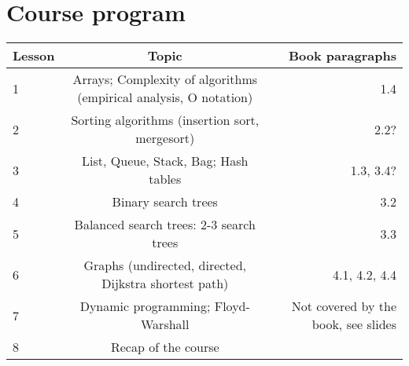 \section{Course program}
	
	\begin{tabular}{ | l | c | r | }
		\hline
	  	\textbf{Lesson} & \textbf{Topic} & \textbf{Book paragraphs} \\
	  	\hline
  		1 & Arrays; Complexity of algorithms (empirical analysis, O notation) & 1.4 \\
  		\hline
  		2 & Sorting algorithms (insertion sort, mergesort) & 2.2? \\
  		\hline
  		3 & List, Queue, Stack, Bag; Hash tables & 1.3, 3.4? \\
  		\hline
  		4 & Binary search trees & 3.2 \\
  		\hline
  		5 & Balanced search trees: 2-3 search trees & 3.3 \\
  		\hline
  		6 & Graphs (undirected, directed, Dijkstra shortest path) & 4.1, 4.2, 4.4 \\
  		\hline
  		7 & Dynamic programming; Floyd-Warshall & Not covered by the book, see slides\\
  		\hline
  		8 & Recap of the course & \\
  		\hline
	\end{tabular}